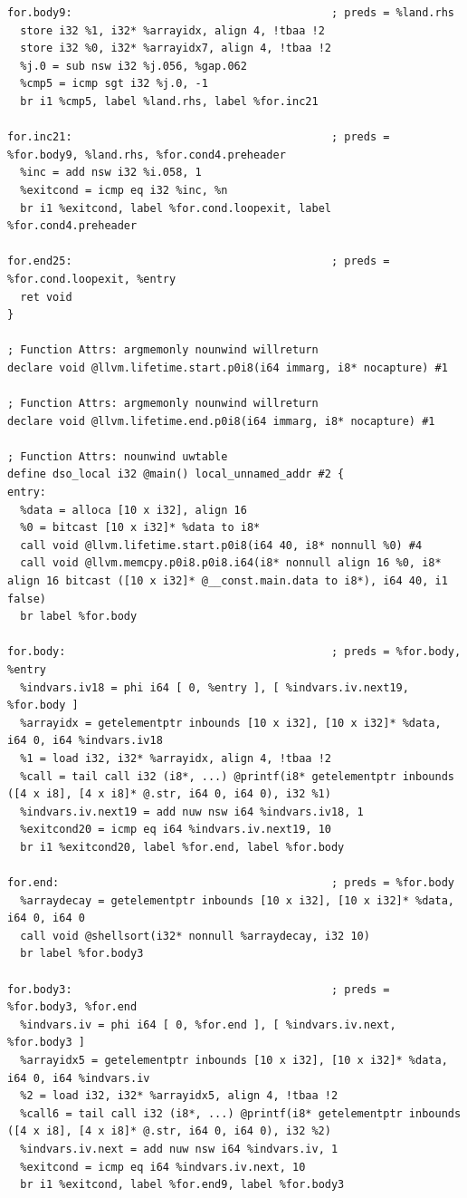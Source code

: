 \documentclass[12pt]{article}
\begin{document}
\begin{itemize}
\begin{lstlisting}[style=CStyle]
for.body9:                                        ; preds = %land.rhs
  store i32 %1, i32* %arrayidx, align 4, !tbaa !2
  store i32 %0, i32* %arrayidx7, align 4, !tbaa !2
  %j.0 = sub nsw i32 %j.056, %gap.062
  %cmp5 = icmp sgt i32 %j.0, -1
  br i1 %cmp5, label %land.rhs, label %for.inc21

for.inc21:                                        ; preds = %for.body9, %land.rhs, %for.cond4.preheader
  %inc = add nsw i32 %i.058, 1
  %exitcond = icmp eq i32 %inc, %n
  br i1 %exitcond, label %for.cond.loopexit, label %for.cond4.preheader

for.end25:                                        ; preds = %for.cond.loopexit, %entry
  ret void
}

; Function Attrs: argmemonly nounwind willreturn
declare void @llvm.lifetime.start.p0i8(i64 immarg, i8* nocapture) #1

; Function Attrs: argmemonly nounwind willreturn
declare void @llvm.lifetime.end.p0i8(i64 immarg, i8* nocapture) #1

; Function Attrs: nounwind uwtable
define dso_local i32 @main() local_unnamed_addr #2 {
entry:
  %data = alloca [10 x i32], align 16
  %0 = bitcast [10 x i32]* %data to i8*
  call void @llvm.lifetime.start.p0i8(i64 40, i8* nonnull %0) #4
  call void @llvm.memcpy.p0i8.p0i8.i64(i8* nonnull align 16 %0, i8* align 16 bitcast ([10 x i32]* @__const.main.data to i8*), i64 40, i1 false)
  br label %for.body

for.body:                                         ; preds = %for.body, %entry
  %indvars.iv18 = phi i64 [ 0, %entry ], [ %indvars.iv.next19, %for.body ]
  %arrayidx = getelementptr inbounds [10 x i32], [10 x i32]* %data, i64 0, i64 %indvars.iv18
  %1 = load i32, i32* %arrayidx, align 4, !tbaa !2
  %call = tail call i32 (i8*, ...) @printf(i8* getelementptr inbounds ([4 x i8], [4 x i8]* @.str, i64 0, i64 0), i32 %1)
  %indvars.iv.next19 = add nuw nsw i64 %indvars.iv18, 1
  %exitcond20 = icmp eq i64 %indvars.iv.next19, 10
  br i1 %exitcond20, label %for.end, label %for.body

for.end:                                          ; preds = %for.body
  %arraydecay = getelementptr inbounds [10 x i32], [10 x i32]* %data, i64 0, i64 0
  call void @shellsort(i32* nonnull %arraydecay, i32 10)
  br label %for.body3

for.body3:                                        ; preds = %for.body3, %for.end
  %indvars.iv = phi i64 [ 0, %for.end ], [ %indvars.iv.next, %for.body3 ]
  %arrayidx5 = getelementptr inbounds [10 x i32], [10 x i32]* %data, i64 0, i64 %indvars.iv
  %2 = load i32, i32* %arrayidx5, align 4, !tbaa !2
  %call6 = tail call i32 (i8*, ...) @printf(i8* getelementptr inbounds ([4 x i8], [4 x i8]* @.str, i64 0, i64 0), i32 %2)
  %indvars.iv.next = add nuw nsw i64 %indvars.iv, 1
  %exitcond = icmp eq i64 %indvars.iv.next, 10
  br i1 %exitcond, label %for.end9, label %for.body3


\end{lstlisting}
\end{itemize}
\end{document}
